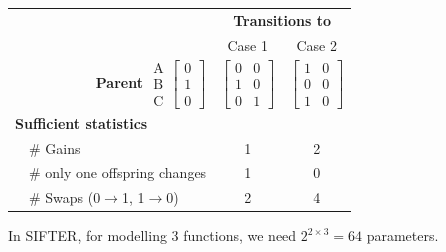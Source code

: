 \documentclass[aspectratio=169, 9pt]{beamer}\usepackage[]{graphicx}\usepackage[]{color}
\begin{document}
\begin{frame}[t]
{\begin{table}
\begin{tabular}{llcc}
  \toprule
  & & \multicolumn{2}{c}{\bf Transitions to} \\
   & & Case 1 & Case 2 \\ \cmidrule(r){3-4}
  \multicolumn{2}{r}{\textbf{Parent} $\begin{array}{c}\mbox{A} \\ \mbox{B} \\ \mbox{C}\end{array}\left[\begin{array}{c}0 \\ 1 \\ 0\end{array}\right]$} & 
  $\left[\begin{array}{cc} %
    0 & 0 \\ %
    1 & 0 \\ %
    0 & 1 %
    \end{array}\right]$ & 
  $\left[\begin{array}{cc} %
    1 & 0 \\ %
    0 & 0 \\ %
    1 & 0 %
    \end{array}\right]$ \pause \\ \midrule 
  \multicolumn{3}{l}{\textbf{Sufficient statistics}} \pause \\ 
  & \# Gains & 1 & 2 \pause \\
  & \# only one offspring changes & 1 & 0 \pause \\
  & \# Swaps (0$\to$1, 1$\to$0) & 2 & 4 \\ \bottomrule
  \end{tabular}
  \end{table}
}

\pause
In SIFTER, for modelling 3 functions, we need $2^{2\times 3} = 64$ parameters.

\end{frame}
\end{document}

